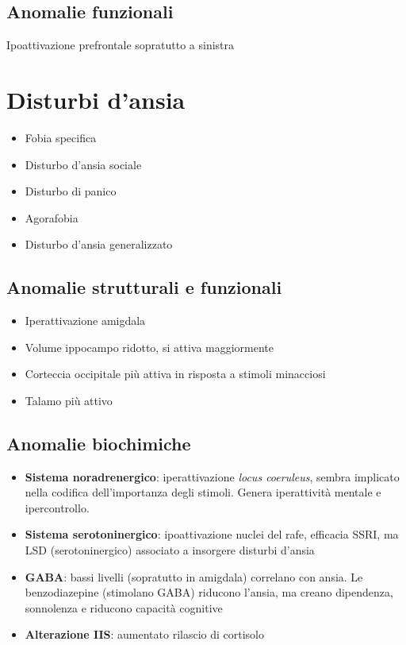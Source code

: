 \documentclass[12pt, a4paper]{article}
\begin{document}
\subsection{Anomalie funzionali} 

Ipoattivazione prefrontale sopratutto a sinistra

\section{Disturbi d'ansia}

\begin{itemize}
    \item Fobia specifica
    \item Disturbo d'ansia sociale
    \item Disturbo di panico 
    \item Agorafobia
    \item Disturbo d'ansia generalizzato
\end{itemize}

\subsection{Anomalie strutturali e funzionali} 

\begin{itemize}
    \item Iperattivazione amigdala
    \item Volume ippocampo ridotto, si attiva maggiormente
    \item Corteccia occipitale più attiva in risposta a stimoli minacciosi
    \item Talamo più attivo
\end{itemize}

\subsection{Anomalie biochimiche} 

\begin{itemize}
    \item \textbf{Sistema noradrenergico}: iperattivazione \emph{locus  coeruleus}, sembra implicato nella codifica dell'importanza degli stimoli. Genera iperattività mentale e ipercontrollo.
    \item \textbf{Sistema serotoninergico}: ipoattivazione nuclei del rafe, efficacia SSRI, ma LSD (serotoninergico) associato a insorgere disturbi d'ansia
    \item \textbf{GABA}: bassi livelli (sopratutto in amigdala) correlano con ansia. Le benzodiazepine (stimolano GABA) riducono l'ansia, ma creano dipendenza, sonnolenza e riducono capacità cognitive
    \item \textbf{Alterazione IIS}: aumentato rilascio di cortisolo
\end{itemize}
\end{document}
